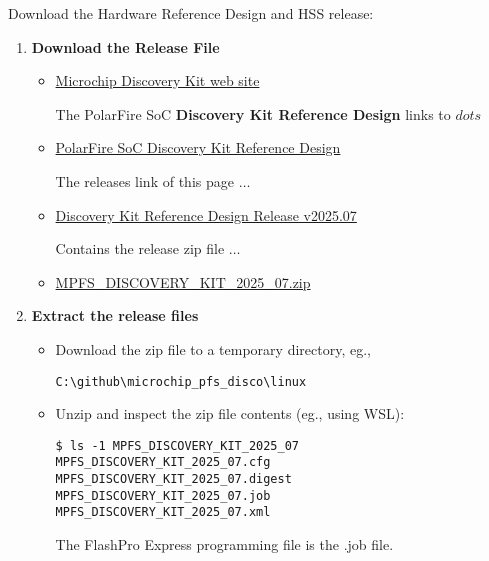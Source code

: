 Download the Hardware Reference Design and HSS release:
%
\begin{enumerate}
\item \textbf{Download the Release File}
%
\begin{itemize}
\item
\href{https://www.microchip.com/en-us/development-tool/mpfs-disco-kit}
{Microchip Discovery Kit web site}

The PolarFire SoC \textbf{Discovery Kit Reference Design} links to $dots$

\item
\href{https://github.com/polarfire-soc/polarfire-soc-discovery-kit-reference-design}
{PolarFire SoC Discovery Kit Reference Design}

The releases link of this page $\dots$

\item
\href{https://github.com/polarfire-soc/polarfire-soc-discovery-kit-reference-design/releases/tag/v2025.07}
{Discovery Kit Reference Design Release v2025.07}

Contains the release zip file $\dots$

\item
\href{https://github.com/polarfire-soc/polarfire-soc-discovery-kit-reference-design/releases/download/v2025.07/MPFS_DISCOVERY_KIT_2025_07.zip}
{MPFS\_DISCOVERY\_KIT\_2025\_07.zip}
\end{itemize}

\item \textbf{Extract the release files}
%
\begin{itemize}
\item Download the zip file to a temporary directory, eg.,

\begin{verbatim}
C:\github\microchip_pfs_disco\linux
\end{verbatim}

\item Unzip and inspect the zip file contents (eg., using WSL):

\begin{verbatim}
$ ls -1 MPFS_DISCOVERY_KIT_2025_07
MPFS_DISCOVERY_KIT_2025_07.cfg
MPFS_DISCOVERY_KIT_2025_07.digest
MPFS_DISCOVERY_KIT_2025_07.job
MPFS_DISCOVERY_KIT_2025_07.xml
\end{verbatim}
The FlashPro Express programming file is the .job file.


\end{itemize}
\end{enumerate}
